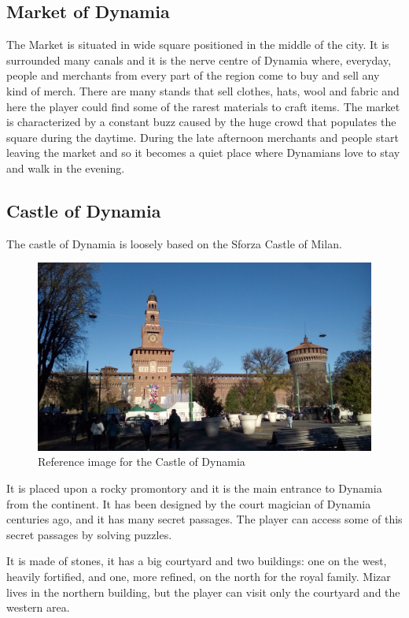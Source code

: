 \subsection{Market of Dynamia}
The Market is situated in wide square positioned in the middle of the city. It is surrounded  many canals and it is the nerve centre of Dynamia where, everyday, people and merchants from every part of the region come to buy and sell any kind of merch. There are many stands that sell clothes, hats, wool and fabric and here the player could find some of the rarest materials to craft items. The market is characterized by a constant buzz caused by the huge crowd that populates  the square during the daytime. During the late afternoon merchants and people start leaving the market and so it becomes a quiet place where Dynamians love to stay and walk in the evening.

\subsection{Castle of Dynamia}
The castle of Dynamia is loosely based on the Sforza Castle of Milan.

\begin{figure}[H]
  \centering
  \includegraphics[width=\textwidth]{../../../References/Images/Dynamia/CastleOfDynamia/20181208_100357}
  \caption{Reference image for the Castle of Dynamia}
\end{figure}

It is placed upon a rocky promontory and it is the main entrance to Dynamia from the continent. It has been designed by the court magician of Dynamia centuries ago, and it has many secret passages. The player can access some of this secret passages by solving puzzles.

It is made of stones, it has a big courtyard and two buildings: one on the west, heavily fortified, and one, more refined, on the north for the royal family. Mizar lives in the northern building, but the player can visit only the courtyard and the western area.

